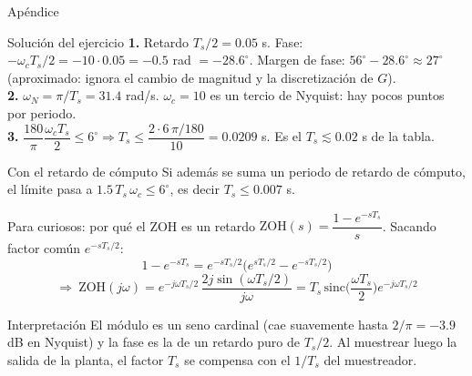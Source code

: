 \documentclass[aspectratio=169,11pt]{beamer}
\begin{document}
\appendix
\begin{frame}\centering\Large Apéndice\end{frame}

\begin{frame}{Solución del ejercicio}
  \small
  \textbf{1.} Retardo $T_s/2=0.05$ s. Fase: $-\omega_c T_s/2=-10\cdot0.05=-0.5$ rad $=-28.6^\circ$. Margen de fase: $56^\circ-28.6^\circ\approx27^\circ$ (aproximado: ignora el cambio de magnitud y la discretización de $G$).\\[3pt]
  \textbf{2.} $\omega_N=\pi/T_s=31.4$ rad/s. $\omega_c=10$ es un tercio de Nyquist: hay pocos puntos por periodo.\\[3pt]
  \textbf{3.} $\dfrac{180}{\pi}\dfrac{\omega_c T_s}{2}\le6^\circ\Rightarrow T_s\le\dfrac{2\cdot6\,\pi/180}{10}=0.0209$ s. Es el $T_s\lesssim0.02$ s de la tabla.
  \begin{block}{Con el retardo de cómputo}
    Si además se suma un periodo de retardo de cómputo, el límite pasa a $1.5\,T_s\,\omega_c\le6^\circ$, es decir $T_s\le0.007$ s.
  \end{block}
\end{frame}

\begin{frame}{Para curiosos: por qué el ZOH es un retardo}
  \small
  $\mathrm{ZOH}(s)=\dfrac{1-e^{-sT_s}}{s}$. Sacando factor común $e^{-sT_s/2}$:
  \[ 1-e^{-sT_s}=e^{-sT_s/2}\big(e^{sT_s/2}-e^{-sT_s/2}\big) \]
  \[ \Rightarrow\ \mathrm{ZOH}(j\omega)=e^{-j\omega T_s/2}\,\frac{2j\sin(\omega T_s/2)}{j\omega}=T_s\,\mathrm{sinc}\Big(\frac{\omega T_s}{2}\Big)e^{-j\omega T_s/2} \]
  \begin{block}{Interpretación}
    El módulo es un seno cardinal (cae suavemente hasta $2/\pi=-3.9$ dB en Nyquist) y la fase es la de un retardo puro de $T_s/2$. Al muestrear luego la salida de la planta, el factor $T_s$ se compensa con el $1/T_s$ del muestreador.
  \end{block}
\end{frame}
\end{document}
